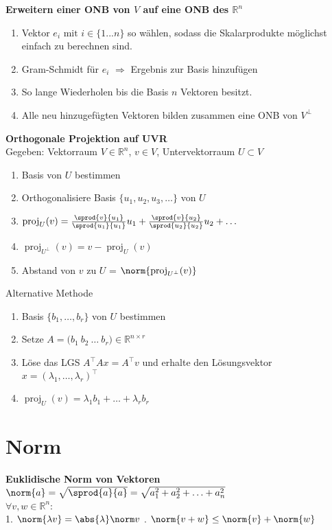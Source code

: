 \documentclass[german, 6pt]{latex4ei/latex4ei_sheet}
\DeclareMathOperator{\proj}{proj}
\begin{document}
\textbf{Erweitern einer ONB von $V$ auf eine ONB des $\mathbb{R}^n$}
\begin{enumerate}\itemsep0pt
	\item Vektor $e_i \text{ mit } i \in \{1...n\}$ so wählen, sodass die Skalarprodukte möglichst einfach zu berechnen sind.
	\item Gram-Schmidt für $e_i$ $\Rightarrow$ Ergebnis zur Basis hinzufügen
	\item So lange Wiederholen bis die Basis $n$ Vektoren besitzt.
	\item Alle neu hinzugefügten Vektoren bilden zusammen eine ONB von $V^\perp$
\end{enumerate}
\textbf{Orthogonale Projektion auf UVR} \\
Gegeben: Vektorraum $V \in \mathbb{R}^n$, $v\in V$, Untervektorraum $U\subset V$
\begin{enumerate}\itemsep0pt
\item Basis von $U$ bestimmen
\item Orthogonalisiere Basis $\{u_1,u_2,u_3,\ldots\}$ von $U$
\item $\proj_U(v) = \frac{\sprod{v}{u_1}}{\sprod{u_1}{u_1}}u_1 + \frac{\sprod{v}{u_2}}{\sprod{u_2}{u_2}}u_2 +\dots$
\item $\proj_{U^\perp}(v)=v-\proj_U(v)$
\item Abstand von $v$ zu $U$ = $\norm{\proj_{U^\perp}(v)}$
\end{enumerate}
Alternative Methode
\begin{enumerate}\itemsep0pt
\item Basis $\{b_1,\ldots,b_r\}$ von $U$ bestimmen
\item Setze $A = \big(b_1\ b_2\ \dots \ b_r\big) \in \mathbb{R}^{n\times r}$
\item Löse das LGS $A^\top Ax=A^\top v$ und erhalte den Lösungsvektor $x=(\lambda_1, \dots,\lambda_r)^\top $
\item $\proj_U(v)=\lambda_1 b_1 +\dots +\lambda_r b_r$
\end{enumerate}

\section{Norm}
\textbf{Euklidische Norm von Vektoren}
$\norm{a}=\sqrt{\sprod{a}{a}} =\sqrt{a_1^2+a_2^2+\ldots +a_n^2}$\\
$\forall v, w \in \mathbb{R}^n$:\\
1. $\norm{\lambda v}=\abs{\lambda}\norm v$
. $\norm{v+w}\le \norm{v} + \norm{w}$
\end{document}
